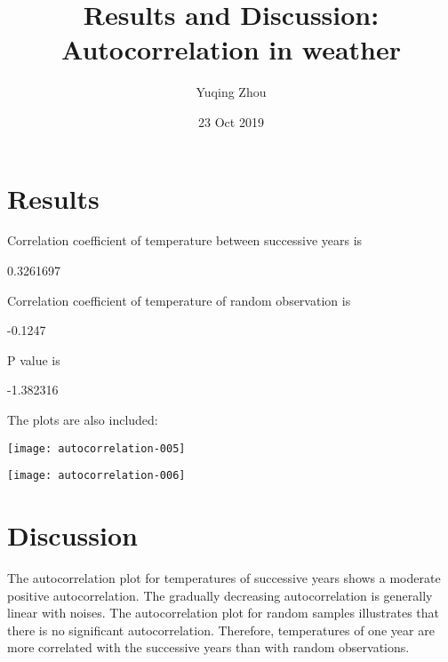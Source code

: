 \documentclass[a4paper]{article}
\title{Results and Discussion: Autocorrelation in weather}
\author{Yuqing Zhou}
\date{23 Oct 2019}
\begin{document}
 \maketitle



\section{Results}
Correlation coefficient of temperature between successive years is 
\begin{Schunk}
\begin{Soutput}
[1] 0.3261697
\end{Soutput}
\end{Schunk}
Correlation coefficient of temperature of random observation is 
\begin{Schunk}
\begin{Soutput}
[1] -0.1247
\end{Soutput}
\end{Schunk}
P value is 
\begin{Schunk}
\begin{Soutput}
[1] -1.382316
\end{Soutput}
\end{Schunk}
The plots are also included:

\begin{center}
\texttt{[image: autocorrelation-005]}
\end{center}

\begin{center}
\texttt{[image: autocorrelation-006]}
\end{center}

\section{Discussion}
The autocorrelation plot for temperatures of successive years shows a moderate positive autocorrelation. The gradually decreasing autocorrelation is generally linear with noises. The autocorrelation plot for random samples illustrates that there is no significant autocorrelation. Therefore, temperatures of one year are more correlated with the successive years than with random observations.
\end{document}
